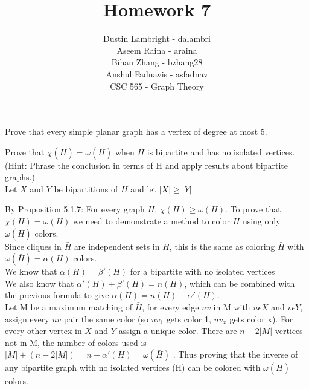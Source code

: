 \documentclass[12pt]{article}
\newenvironment{question}[2][Question]{\begin{trivlist}
\item[\hskip \labelsep {\bfseries #1}\hskip \labelsep {\bfseries #2.}]}{\end{trivlist}}
\begin{document}


\title{Homework 7}%
\author{Dustin Lambright - dalambri \\ Aseem Raina - araina \\ Bihan Zhang - bzhang28 \\ Anshul Fadnavis - asfadnav\\
CSC 565 - Graph Theory} %

\maketitle


\begin{question}{1}
Prove that every simple planar graph has a vertex of degree at most 5.
\end{question}

\begin{question}{4}
Prove that $\chi(\bar{H}) = \omega(\bar{H})$ when $H$ is bipartite and has no isolated vertices. (Hint: Phrase the conclusion in terms of H and apply results about bipartite graphs.)\\

Let $X$ and $Y$ be bipartitions of $H$ and let $|X| \geq |Y| $

By Proposition 5.1.7: For every graph $H$, $\chi(H)\geq\omega(H)$. To prove that $\chi(H)= \omega(H)$ we need to demonstrate a method to color $\bar{H}$ using only $\omega(\bar{H})$ colors.\\

Since cliques in $\bar{H}$ are independent sets in $H$, this is the same as coloring $\bar{H}$ with $\omega(\bar{H}) =  \alpha(H)$ colors.\\ 

We know that $\alpha(H) = \beta'(H)$ for a bipartite with no isolated vertices\\

We also know that $\alpha'(H) + \beta'(H) = n(H)$, which can be combined with the previous formula to give $\alpha(H) = n(H)-\alpha'(H)$. \\

Let M be a maximum matching of $\bar{H}$, for every edge $uv$ in M with $u \epsilon X$ and $v \epsilon Y$, assign every $uv$ pair the same color (so ${uv}_1$ gets color 1, ${uv}_x$ gets color x). For every other vertex in $X$ and $Y$ assign a unique color. There are $n-2|M|$ vertices not in M, the number of colors used is $|M| + (n-2|M|) = n - \alpha'(H) = \omega(\bar{H})$ . Thus proving that the inverse of any bipartite graph with no isolated vertices (H) can be colored with $\omega(\bar{H})$ colors.

\end{question}
\end{document}
